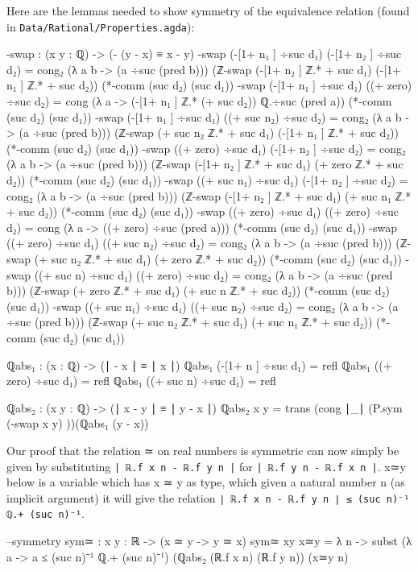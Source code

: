 \documentclass[11pt,a4paper]{article}
\begin{document}
Here are the lemmas needed to show symmetry of the equivalence relation (found in \texttt{Data/Rational/Properties.agda}):
\begin{code}
-swap : (x y : ℚ) -> (- (y - x) ≡ x - y)
-swap (-[1+ n₁ ] ÷suc d₁) (-[1+ n₂ ] ÷suc d₂) = 
  cong₂ (λ a b -> (a ÷suc (pred b))) 
  (ℤ-swap (-[1+ n₂ ] ℤ.* + suc d₁) (-[1+ n₁ ] ℤ.* + suc d₂)) 
  (*-comm (suc d₂) (suc d₁))
-swap (-[1+ n₁ ] ÷suc d₁) ((+ zero) ÷suc d₂) = 
  cong (λ a -> (-[1+ n₁ ] ℤ.* (+ suc d₂)) ℚ.÷suc (pred a))
  (*-comm (suc d₂) (suc d₁))
-swap (-[1+ n₁ ] ÷suc d₁) ((+ suc n₂) ÷suc d₂) = 
  cong₂ (λ a b -> (a ÷suc (pred b))) 
  (ℤ-swap (+ suc n₂ ℤ.* + suc d₁) (-[1+ n₁ ] ℤ.* + suc d₂)) 
  (*-comm (suc d₂) (suc d₁))
-swap ((+ zero) ÷suc d₁) (-[1+ n₂ ] ÷suc d₂) = 
  cong₂ (λ a b -> (a ÷suc (pred b))) 
  (ℤ-swap (-[1+ n₂ ] ℤ.* + suc d₁) (+ zero ℤ.* + suc d₂)) 
  (*-comm (suc d₂) (suc d₁))
-swap ((+ suc n₁) ÷suc d₁) (-[1+ n₂ ] ÷suc d₂) = 
  cong₂ (λ a b -> (a ÷suc (pred b))) 
  (ℤ-swap (-[1+ n₂ ] ℤ.* + suc d₁) (+ suc n₁ ℤ.* + suc d₂)) 
  (*-comm (suc d₂) (suc d₁))
-swap ((+ zero) ÷suc d₁) ((+ zero) ÷suc d₂) = 
  cong (λ a -> ((+ zero) ÷suc (pred a)))
  (*-comm (suc d₂) (suc d₁))
-swap ((+ zero) ÷suc d₁) ((+ suc n₂) ÷suc d₂) = 
  cong₂ (λ a b -> (a ÷suc (pred b))) 
  (ℤ-swap (+ suc n₂ ℤ.* + suc d₁) (+ zero ℤ.* + suc d₂)) 
  (*-comm (suc d₂) (suc d₁))
-swap ((+ suc n) ÷suc d₁) ((+ zero) ÷suc d₂) = 
  cong₂ (λ a b -> (a ÷suc (pred b))) 
  (ℤ-swap (+ zero ℤ.* + suc d₁) (+ suc n ℤ.* + suc d₂)) 
  (*-comm (suc d₂) (suc d₁))
-swap ((+ suc n₁) ÷suc d₁) ((+ suc n₂) ÷suc d₂) = 
  cong₂ (λ a b -> (a ÷suc (pred b))) 
  (ℤ-swap (+ suc n₂ ℤ.* + suc d₁) (+ suc n₁ ℤ.* + suc d₂)) 
  (*-comm (suc d₂) (suc d₁))

ℚabs₁ : (x : ℚ) -> (∣ - x ∣ ≡ ∣ x ∣)
ℚabs₁ (-[1+ n ] ÷suc d₁) = refl
ℚabs₁ ((+ zero) ÷suc d₁) = refl
ℚabs₁ ((+ suc n) ÷suc d₁) = refl

ℚabs₂ : (x y : ℚ) -> (∣ x - y ∣ ≡ ∣ y - x ∣)
ℚabs₂ x y = trans (cong ∣_∣ (P.sym (-swap x y) ))(ℚabs₁ (y - x))
\end{code}
Our proof that the relation ≃ on real numbers is symmetric can now simply be given by substituting \texttt{| ℝ.f x n - ℝ.f y n |} for \texttt{| ℝ.f y n - ℝ.f x n |}. x≃y below is a variable which has x ≃ y as type, which given a natural number n (as implicit argument) it will give the relation \texttt{∣ ℝ.f x n - ℝ.f y n ∣ ≤ (suc n)⁻¹ ℚ.+ (suc n)⁻¹}.
\begin{code}
  --symmetry
  sym≃ : {x y : ℝ} -> (x ≃ y -> y ≃ x)
  sym≃ {x}{y} x≃y = λ {n} -> 
    subst (λ a -> a ≤ (suc n)⁻¹ ℚ.+ (suc n)⁻¹) 
    (ℚabs₂ (ℝ.f x n) (ℝ.f y n)) (x≃y {n})
\end{code}
\end{document}
